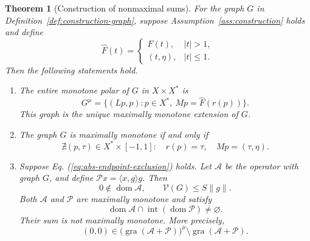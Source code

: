 \documentclass[11pt]{article}
\newcommand{\gra}{\operatorname{gra}}
\newcommand{\dom}{\operatorname{dom}}
\newcommand{\pair}[2]{\langle #1,#2\rangle}
\newtheorem{theorem}{Theorem}
\theoremstyle{definition}
\theoremstyle{remark}
\begin{document}
\begin{theorem}[Construction of nonmaximal sums]
\label{thm:endpoint-criterion}
For the graph $G$ in Definition~\ref{def:construction-graph}, suppose Assumption~\ref{ass:construction} holds and define
\[
\widehat F(t)=
\begin{cases}
F(t),&|t|>1,\\
(t,\eta),&|t|\le1.
\end{cases}
\]
Then the following statements hold.
\begin{enumerate}
\renewcommand{\theenumi}{\roman{enumi}}
\renewcommand{\labelenumi}{(\theenumi)}
\item\label{thm:polar-part} The entire monotone polar of $G$ in $X\times X^*$ is
\begin{equation}
G^\mu=\{(Lp,p):p\in X^*,\ Mp=\widehat F(r(p))\}.
\label{eq:abs-entire-polar}
\end{equation}
This graph is the unique maximally monotone extension of $G$.

\item\label{thm:maximality-part} The graph $G$ is maximally monotone if and only if
\begin{equation}
\nexists(p,\tau)\in X^*\times[-1,1]:
\quad r(p)=\tau,\quad Mp=(\tau,\eta).
\label{eq:abs-endpoint-exclusion}
\end{equation}

\item\label{thm:sum-part} Suppose Eq. (\ref{eq:abs-endpoint-exclusion}) holds.
Let $\mathcal A$ be the operator with graph $G$, and define $\mathcal P x=\pair{x}{g}g$. Then
\[
0\notin\dom\mathcal A,\qquad \mathcal V(G)\le S\|g\|.
\]
Both $\mathcal A$ and $\mathcal P$ are maximally monotone and satisfy
\[
\dom\mathcal A\cap\operatorname{int}(\dom\mathcal P)\ne\varnothing.
\]
Their sum is not maximally monotone. More precisely,
\[
(0,0)\in
\bigl(\gra(\mathcal A+\mathcal P)\bigr)^\mu
\setminus\gra(\mathcal A+\mathcal P).
\]
\end{enumerate}
\end{theorem}
\end{document}
